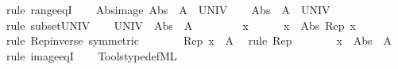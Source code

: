 \begin{isabellebody}
\ {\isacharparenleft}{\kern0pt}rule\ range{\isacharunderscore}{\kern0pt}eqI{\isacharparenright}{\kern0pt}\isanewline
\ \ \isamarkupfalse%
\isanewline
{}\isamarkupfalse%
%
\endisatagproof
{\isafoldproof}%
%
\isadelimproof
\isanewline
%
\endisadelimproof
\isanewline
{}\isamarkupfalse%
\ Abs{\isacharunderscore}{\kern0pt}image{\isacharcolon}{\kern0pt}\ {\isachardoublequoteopen}Abs\ {\isacharbackquote}{\kern0pt}\ A\ {\isacharequal}{\kern0pt}\ UNIV{\isachardoublequoteclose}\isanewline
%
\isadelimproof
%
\endisadelimproof
%
\isatagproof
{}\isamarkupfalse%
\isanewline
\ \ \isamarkupfalse%
\ {\isachardoublequoteopen}Abs\ {\isacharbackquote}{\kern0pt}\ A\ {\isasymsubseteq}\ UNIV{\isachardoublequoteclose}\ \isamarkupfalse%
\ {\isacharparenleft}{\kern0pt}rule\ subset{\isacharunderscore}{\kern0pt}UNIV{\isacharparenright}{\kern0pt}\isanewline
\ \ \isamarkupfalse%
\ {\isachardoublequoteopen}UNIV\ {\isasymsubseteq}\ Abs\ {\isacharbackquote}{\kern0pt}\ A{\isachardoublequoteclose}\isanewline
\ \ \isamarkupfalse%
\isanewline
\ \ \ \ \isamarkupfalse%
\ x\isanewline
\ \ \ \ \isamarkupfalse%
\ {\isachardoublequoteopen}x\ {\isacharequal}{\kern0pt}\ Abs\ {\isacharparenleft}{\kern0pt}Rep\ x{\isacharparenright}{\kern0pt}{\isachardoublequoteclose}\ \isamarkupfalse%
\ {\isacharparenleft}{\kern0pt}rule\ Rep{\isacharunderscore}{\kern0pt}inverse\ {\isacharbrackleft}{\kern0pt}symmetric{\isacharbrackright}{\kern0pt}{\isacharparenright}{\kern0pt}\isanewline
\ \ \ \ \isamarkupfalse%
\ \isamarkupfalse%
\ {\isachardoublequoteopen}Rep\ x\ {\isasymin}\ A{\isachardoublequoteclose}\ \isamarkupfalse%
\ {\isacharparenleft}{\kern0pt}rule\ Rep{\isacharparenright}{\kern0pt}\isanewline
\ \ \ \ \isamarkupfalse%
\ \isamarkupfalse%
\ {\isachardoublequoteopen}x\ {\isasymin}\ Abs\ {\isacharbackquote}{\kern0pt}\ A{\isachardoublequoteclose}\ \isamarkupfalse%
\ {\isacharparenleft}{\kern0pt}rule\ image{\isacharunderscore}{\kern0pt}eqI{\isacharparenright}{\kern0pt}\isanewline
\ \ \isamarkupfalse%
\isanewline
{}\isamarkupfalse%
%
\endisatagproof
{\isafoldproof}%
%
\isadelimproof
\isanewline
%
\endisadelimproof
\isanewline
{}\isamarkupfalse%
\isanewline
%
\isadelimML
\isanewline
%
\endisadelimML
%
\isatagML
{}\isamarkupfalse%
\ {\isacartoucheopen}Tools{\isacharslash}{\kern0pt}typedef{\isachardot}{\kern0pt}ML{\isacartoucheclose}%
\endisatagML
{\isafoldML}%
%
\isadelimML
\isanewline
%
\endisadelimML
%
\isadelimtheory
\isanewline
%
\endisadelimtheory
%
\isatagtheory
{}\isamarkupfalse%
%
\endisatagtheory
{\isafoldtheory}%
%
\isadelimtheory
%
\endisadelimtheory
%
\end{isabellebody}%
